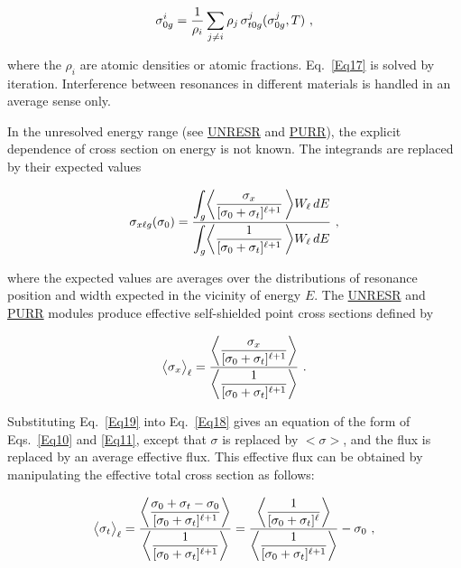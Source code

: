   \begin{equation}
    \sigma_{0g}^i={{1}\over{\rho_i}}
    \sum_{j\ne i}\rho_j \,\sigma_{t0g}^j(\sigma_{0g}^j,T)\,\,,
  \label{Eq17}
  \end{equation}

\noindent
where the $\rho_i$ are atomic densities or atomic fractions.
Eq.~\ref{Eq17} is solved by iteration.  Interference between resonances
in different materials is handled in an average sense only.

In the unresolved energy range
(see \hyperlink{sUNRESRhy}{UNRESR} and
\hyperlink{sPURRhy}{PURR}), the explicit dependence
of cross section on energy is not known.  The integrands are replaced
by their expected values

  \begin{equation}
    \sigma_{x\ell g}(\sigma_0)=
    {\displaystyle{\int_g\biggl<{{\sigma_x}\over{[\sigma_0+\sigma_t]^{\ell+1}}}
    \,\biggr>W_{\ell}\,dE}
    \over\displaystyle{\int_g\biggl<{1\over{[\sigma_0+\sigma_t]^{\ell+1}}}
    \,\biggr>W_{\ell}\,dE}}\,\,,
  \label{Eq18}
  \end{equation}

\noindent
where the expected values are averages over the distributions of
resonance position and width expected in the vicinity of energy $E$.
The \hyperlink{sUNRESRhy}{UNRESR} and \hyperlink{sPURRhy}{PURR}
modules produce effective self-shielded point
cross sections defined by

  \begin{equation}
    \bigl<\sigma_x\bigr>_{\ell}=
    {{\displaystyle{\biggl<{{\sigma_x}\over{[\sigma_0
    +\sigma_t]^{\ell+1}}}}\biggr>}
    \over\displaystyle{\biggl<
    {1\over{[\sigma_0+\sigma_t]^{\ell+1}}}\biggr>}}\,\,.
  \label{Eq19}
  \end{equation}

\noindent
Substituting Eq.~\ref{Eq19} into Eq.~\ref{Eq18} gives an equation of
the form of Eqs.~\ref{Eq10} and \ref{Eq11}, except that $\sigma$ is
replaced by $\bigl<\sigma\bigr>$, and the flux is replaced by an average
effective flux.  This effective flux can be obtained by manipulating the
effective total cross section as follows:

  \begin{equation}
    \bigl<\sigma_t\bigr>_{\ell}=
    {\displaystyle{\biggl<{{\sigma_0+\sigma_t-\sigma_0}
    \over{[\sigma_0+\sigma_t]^{\ell+1}}}\biggr>}
    \over\displaystyle{\biggl<{{1}\over
    {[\sigma_0+\sigma_t]^{\ell+1}}}\biggr>}}
    ={\displaystyle{\biggl<{1
    \over{[\sigma_0+\sigma_t]^{\ell}}}\biggr>}
    \over\displaystyle{\biggl<{{1}\over
    {[\sigma_0+\sigma_t]^{\ell+1}}}\biggr>}}-\sigma_0\,\,,
  \end{equation}


